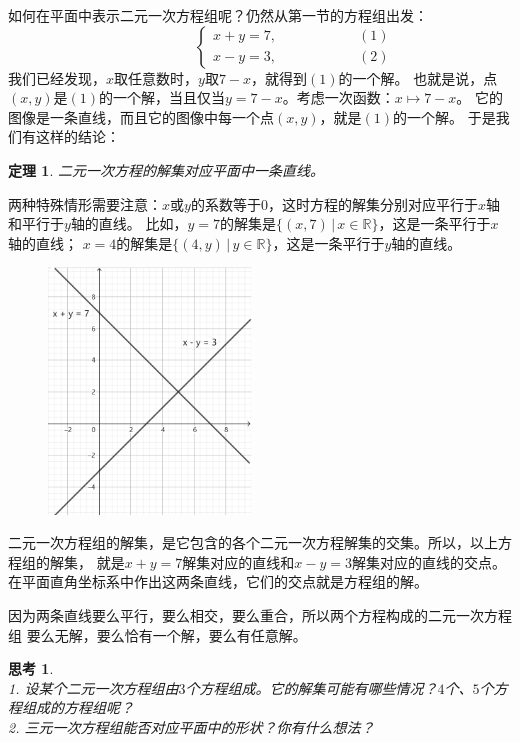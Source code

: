 \documentclass[12pt,UTF8]{ctexbook}
\newtheorem{tm}{定理}[section]
\newtheorem{sk}{思考}[section]
\begin{document}
如何在平面中表示二元一次方程组呢？仍然从第一节的方程组出发：
$$ \quad \quad \quad \quad \quad\left\{
\begin{array}{cr}
     x + y = 7, & \quad \quad \quad \quad \quad (1) \\
     x - y = 3, & \quad \quad \quad \quad \quad (2)
\end{array}\right.
$$
我们已经发现，$x$取任意数时，$y$取$7 - x$，就得到$(1)$的一个解。
也就是说，点$(x, y)$是$(1)$的一个解，当且仅当$y = 7 - x$。考虑一次函数：$x \mapsto 7 - x$。
它的图像是一条直线，而且它的图像中每一个点$(x, y)$，就是$(1)$的一个解。
于是我们有这样的结论：
\begin{tm}
    二元一次方程的解集对应平面中一条直线。
\end{tm}
两种特殊情形需要注意：$x$或$y$的系数等于$0$，这时方程的解集分别对应平行于$x$轴和平行于$y$轴的直线。
比如，$y = 7$的解集是$\{(x, 7) \,|\, x\in\mathbb{R}\}$，这是一条平行于$x$轴的直线；
$x = 4$的解集是$\{(4, y) \,|\, y\in\mathbb{R}\}$，这是一条平行于$y$轴的直线。

\begin{figure} %
    \vspace{-15pt}
    \flushright
    \includegraphics[width=0.48\textwidth]{二元一次方程组.png}
\end{figure}

二元一次方程组的解集，是它包含的各个二元一次方程解集的交集。所以，以上方程组的解集，
就是$x + y = 7$解集对应的直线和$x - y = 3$解集对应的直线的交点。
在平面直角坐标系中作出这两条直线，它们的交点就是方程组的解。

因为两条直线要么平行，要么相交，要么重合，所以两个方程构成的二元一次方程组
要么无解，要么恰有一个解，要么有任意解。

\begin{sk}
    \mbox{}\\
    1. 设某个二元一次方程组由$3$个方程组成。它的解集可能有哪些情况？$4$个、$5$个方程组成的方程组呢？\\
    2. 三元一次方程组能否对应平面中的形状？你有什么想法？
\end{sk}
\end{document}
